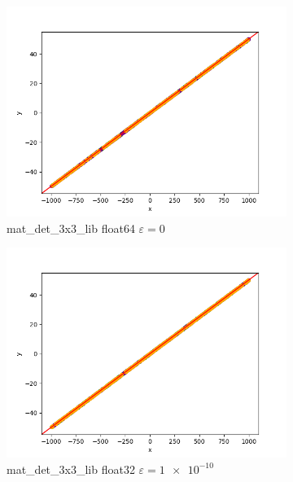 \documentclass[11pt,a4paper]{article}
\begin{document}
\begin{figure}[H]
\begin{subfigure}[b]{0.46\textwidth}
        \centering
        \includegraphics[scale=0.4]{res/lin_mat_det_3x3_lib_float64_0.png}
        \caption{\ttfamily\arraybackslash mat\_det\_3x3\_lib float64 $\varepsilon=\num{0}$}
    \end{subfigure}
    \begin{subfigure}[b]{0.46\textwidth}
        \centering
        \includegraphics[scale=0.4]{res/lin_mat_det_3x3_lib_float32_1e-10.png}
        \caption{\ttfamily\arraybackslash mat\_det\_3x3\_lib float32 $\varepsilon=\num{1e-10}$}
    \end{subfigure}
    \begin{subfigure}[b]{0.46\textwidth}
        \centering

\end{subfigure}
\end{figure}
\end{document}
